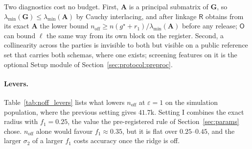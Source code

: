 \documentclass[11pt]{article}
\theoremstyle{definition}
\theoremstyle{plain}
\newcommand{\bA}{\mathbf{A}}
\newcommand{\bG}{\mathbf{G}}
\newcommand{\Party}[1]{\textsf{#1}}
\newcommand{\Rp}{\Party{R}}
\newcommand{\Op}{\Party{O}}
\begin{document}
Two diagnostics cost no budget. First, $\bA$ is a principal submatrix of $\bG$, so $\lambda_{\min}(\bG) \le \lambda_{\min}(\bA)$ by Cauchy interlacing, and after linkage $\Rp$ obtains from its exact $\bA$ the lower bound $n_{\mathrm{off}} \ge n(g^\star + r_1)/\lambda_{\min}(\bA)$ before any release; $\Op$ can bound $\ell$ the same way from its own block on the register. Second, a collinearity across the parties is invisible to both but visible on a public reference set that carries both schemas, where one exists; screening features on it is the optional Setup module of Section~\ref{sec:protocol:preproc}.

\paragraph{Levers.} Table~\ref{tab:noff_levers} lists what lowers $n_{\mathrm{off}}$ at $\varepsilon = 1$ on the simulation population, where the previous setting gives $41.7$k. Setting I combines the exact radius with $f_1 = 0.25$, the value the pre-registered rule of Section~\ref{sec:params} chose. $n_{\mathrm{off}}$ alone would favour $f_1 \approx 0.35$, but it is flat over $0.25$--$0.45$, and the larger $\sigma_2$ of a larger $f_1$ costs accuracy once the ridge is off.
\end{document}
